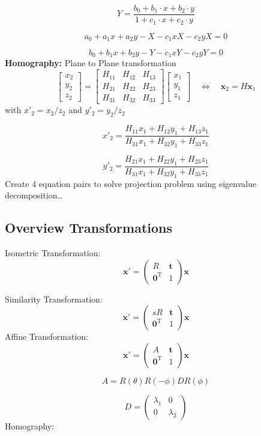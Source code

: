 \[
Y = \frac{b_0 + b_1 \cdot x + b_2 \cdot y}{1 + c_1 \cdot x + c_2 \cdot y}
\]

\[
a_0 + a_1 x + a_2 y - X - c_1 x X - c_2 y X = 0
\]

\[
b_0 + b_1 x + b_2 y - Y - c_1 x Y - c_2 y Y = 0
\]
\textbf{Homography:} Plane to Plane transformation
\[
\begin{bmatrix}
x_2 \\
y_2 \\
z_2
\end{bmatrix}
=
\begin{bmatrix}
H_{11} & H_{12} & H_{13} \\
H_{21} & H_{22} & H_{23} \\
H_{31} & H_{32} & H_{33}
\end{bmatrix}
\begin{bmatrix}
x_1 \\
y_1 \\
z_1
\end{bmatrix}
\quad \Leftrightarrow \quad
\mathbf{x}_2 = H \mathbf{x}_1
\]
with \(x'_2 = x_2/z_2\) and \(y'_2 = y_2/z_2\)

\[
x'_2 = \frac{H_{11}x_1 + H_{12}y_1 + H_{13}z_1}{H_{31}x_1 + H_{32}y_1 + H_{33}z_1}
\]

\[
y'_2 = \frac{H_{21}x_1 + H_{22}y_1 + H_{23}z_1}{H_{31}x_1 + H_{32}y_1 + H_{33}z_1}
\]
Create 4 equation pairs to solve projection problem using eigenvalue decomposition…
\subsection{Overview Transformations}
Isometric Transformation:
\[
\mathbf{x}' = 
\begin{pmatrix}
R & \mathbf{t} \\
\mathbf{0}^\mathrm{T} & 1
\end{pmatrix}
\mathbf{x}
\]

Similarity Transformation:
\[
\mathbf{x}' = 
\begin{pmatrix}
sR & \mathbf{t} \\
\mathbf{0}^\mathrm{T} & 1
\end{pmatrix}
\mathbf{x}
\]
Affine Transformation:
\[
\mathbf{x}' = 
\begin{pmatrix}
A & \mathbf{t} \\
\mathbf{0}^\mathrm{T} & 1
\end{pmatrix}
\mathbf{x}
\]

\[
A = R(\theta) R(-\phi) D R(\phi)
\]

\[
D = 
\begin{pmatrix}
\lambda_1 & 0 \\
0 & \lambda_2
\end{pmatrix}
\]
Homography:

